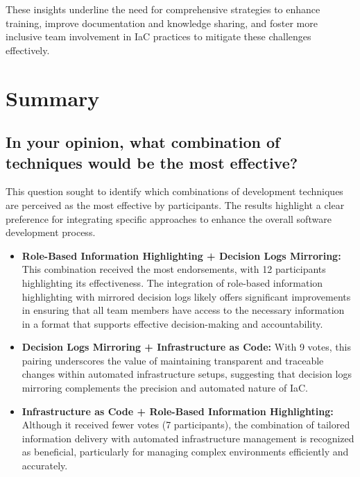 These insights underline the need for comprehensive strategies to enhance training, improve documentation and knowledge sharing, and foster more inclusive team involvement in \ac{IaC} practices to mitigate these challenges effectively.


\section{Summary}

\subsection*{In your opinion, what combination of techniques would be the most effective?}

This question sought to identify which combinations of development techniques are perceived as the most effective by participants. The results highlight a clear preference for integrating specific approaches to enhance the overall software development process.

\begin{itemize}
    \item \textbf{Role-Based Information Highlighting + Decision Logs Mirroring:} This combination received the most endorsements, with 12 participants highlighting its effectiveness. The integration of role-based information highlighting with mirrored decision logs likely offers significant improvements in ensuring that all team members have access to the necessary information in a format that supports effective decision-making and accountability.

    \item \textbf{Decision Logs Mirroring + Infrastructure as Code:} With 9 votes, this pairing underscores the value of maintaining transparent and traceable changes within automated infrastructure setups, suggesting that decision logs mirroring complements the precision and automated nature of IaC.

    \item \textbf{Infrastructure as Code + Role-Based Information Highlighting:} Although it received fewer votes (7 participants), the combination of tailored information delivery with automated infrastructure management is recognized as beneficial, particularly for managing complex environments efficiently and accurately.
\end{itemize}


